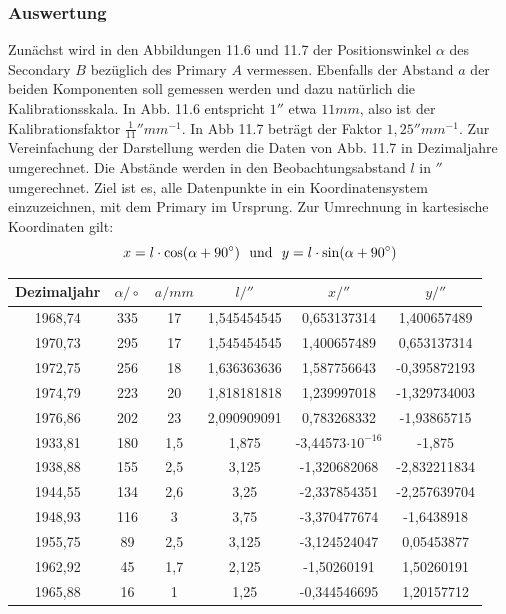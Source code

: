 \documentclass[12pt]{article}
\begin{document}
\subsubsection*{Auswertung}
Zunächst wird in den Abbildungen 11.6 und 11.7 der Positionswinkel $\alpha$ des Secondary $B$ bezüglich des Primary $A$ vermessen. Ebenfalls der Abstand $a$ der beiden Komponenten soll gemessen werden und dazu natürlich die Kalibrationsskala. In Abb. 11.6 entspricht $1''$ etwa $11mm$, also ist der Kalibrationsfaktor $\frac{1}{11}''mm^{-1}$. In Abb 11.7 beträgt der Faktor $1,25 ''mm^{-1}$. Zur Vereinfachung der Darstellung werden die Daten von Abb. 11.7 in Dezimaljahre umgerechnet. Die Abstände werden in den Beobachtungsabstand $l$ in $''$ umgerechnet.
Ziel ist es, alle Datenpunkte in ein Koordinatensystem einzuzeichnen, mit dem Primary im Ursprung. Zur Umrechnung in kartesische Koordinaten gilt:
\[x = l \cdot \cos (\alpha + 90^\circ) \ \ \textnormal{und} \ \ y = l \cdot \sin(\alpha+90^\circ)\]
\begin{table}[!ht]
    \centering
    \begin{tabular}{c|c|c|c|c|c}
        Dezimaljahr & $\alpha / \circ$ & $a/mm$ & $l / ''$ & $x/''$ & $y/''$ \\ \hline
        1968,74 & 335 & 17 & 1,545454545 & 0,653137314 & 1,400657489 \\ 
        1970,73 & 295 & 17 & 1,545454545 & 1,400657489 & 0,653137314 \\ 
        1972,75 & 256 & 18 & 1,636363636 & 1,587756643 & -0,395872193 \\ 
        1974,79 & 223 & 20 & 1,818181818 & 1,239997018 & -1,329734003 \\ 
        1976,86 & 202 & 23 & 2,090909091 & 0,783268332 & -1,93865715 \\ 
        1933,81 & 180 & 1,5 & 1,875 & -3,44573$\cdot 10^{-16}$ & -1,875 \\ 
        1938,88 & 155 & 2,5 & 3,125 & -1,320682068 & -2,832211834 \\ 
        1944,55 & 134 & 2,6 & 3,25 & -2,337854351 & -2,257639704 \\ 
        1948,93 & 116 & 3 & 3,75 & -3,370477674 & -1,6438918 \\ 
        1955,75 & 89 & 2,5 & 3,125 & -3,124524047 & 0,05453877 \\ 
        1962,92 & 45 & 1,7 & 2,125 & -1,50260191 & 1,50260191 \\ 
        1965,88 & 16 & 1 & 1,25 & -0,344546695 & 1,20157712 \\ 
    \end{tabular}
\end{table}\\
\end{document}
